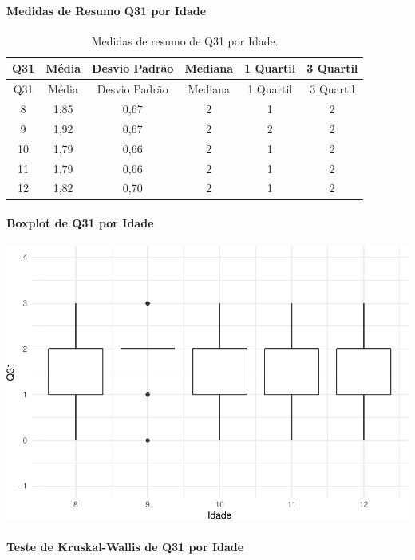 \documentclass[]{article}
\let\oldparagraph\paragraph
\renewcommand{\paragraph}[1]{\oldparagraph{#1}\mbox{}}
\begin{document}
\cleardoublepage

\hypertarget{medidas-de-resumo-q31-por-idade}{%
\paragraph{Medidas de Resumo Q31 por Idade}\label{medidas-de-resumo-q31-por-idade}}

\begin{longtable}[]{@{}cccccc@{}}
\caption{\label{tab:unnamed-chunk-1040}Medidas de resumo de Q31 por Idade.}\tabularnewline
\toprule
Q31 & Média & Desvio Padrão & Mediana & 1 Quartil & 3 Quartil\tabularnewline
\midrule
\endfirsthead
\toprule
Q31 & Média & Desvio Padrão & Mediana & 1 Quartil & 3 Quartil\tabularnewline
\midrule
\endhead
8 & 1,85 & 0,67 & 2 & 1 & 2\tabularnewline
9 & 1,92 & 0,67 & 2 & 2 & 2\tabularnewline
10 & 1,79 & 0,66 & 2 & 1 & 2\tabularnewline
11 & 1,79 & 0,66 & 2 & 1 & 2\tabularnewline
12 & 1,82 & 0,70 & 2 & 1 & 2\tabularnewline
\bottomrule
\end{longtable}

\hypertarget{boxplot-de-q31-por-idade}{%
\paragraph{Boxplot de Q31 por Idade}\label{boxplot-de-q31-por-idade}}

\begin{center}\includegraphics[width=0.75\linewidth]{relatorio_covid19_files/figure-latex/unnamed-chunk-1041-1} \end{center}

\hypertarget{teste-de-kruskal-wallis-de-q31-por-idade}{%
\paragraph{Teste de Kruskal-Wallis de Q31 por Idade}\label{teste-de-kruskal-wallis-de-q31-por-idade}}
\end{document}
